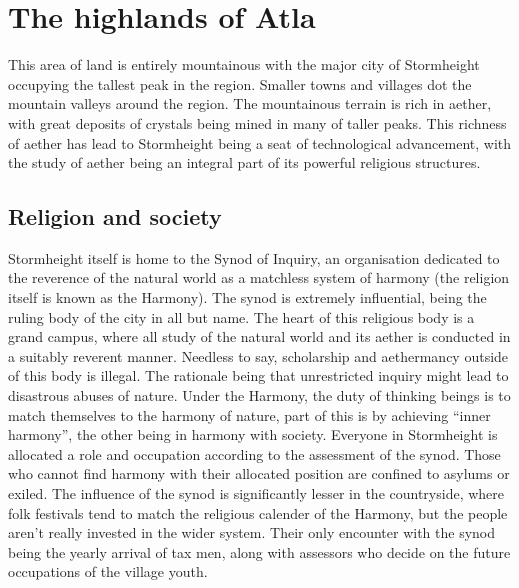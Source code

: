 \documentclass[a4paper,11pt,oneside]{book}
\newcommand{\textlf}[1]{\textbf{\titlecap{#1}}}
\begin{document}
%



\chapter{The highlands of Atla}
This area of land is entirely mountainous with the major city of Stormheight occupying the tallest peak in the region. Smaller towns and villages dot the mountain valleys around the region. The mountainous terrain is rich in aether, with great deposits of crystals being mined in many of taller peaks. This richness of aether has lead to Stormheight being a seat of technological advancement, with the study of aether being an integral part of its powerful religious structures.  

\section{Religion and society}
Stormheight itself is home to the Synod of Inquiry, an organisation dedicated to the reverence of the natural world as a matchless system of harmony (the religion itself is known as the Harmony). The synod is extremely influential, being the ruling body of the city in all but name. The heart of this religious body is a grand campus, where all study of the natural world and its aether is conducted in a suitably reverent manner. Needless to say, scholarship and aethermancy outside of this body is illegal. The rationale being that unrestricted inquiry might lead to disastrous abuses of nature. Under the Harmony, the duty of thinking beings is to match themselves to the harmony of nature, part of this is by achieving ``inner harmony'', the other being in harmony with society. Everyone in Stormheight is allocated a role and occupation according to the assessment of the synod. Those who cannot find harmony with their allocated position are confined to asylums or exiled. The influence of the synod is significantly lesser in the countryside, where folk festivals tend to match the religious calender of the Harmony, but the people aren't really invested in the wider system. Their only encounter with the synod being the yearly arrival of tax men, along with assessors who decide on the future occupations of the village youth.
\end{document}
